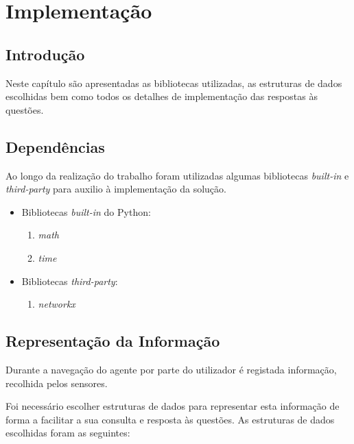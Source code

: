 \section{Implementação}
\label{chap:estado-da-arte}

\subsection{Introdução}
\label{chap2:sec:intro}

Neste capítulo são apresentadas as bibliotecas utilizadas, as estruturas de dados escolhidas bem como todos os detalhes de implementação das respostas às questões.

\subsection{Dependências}
\label{chap2:sec:dependencias}

Ao longo da realização do trabalho foram utilizadas algumas bibliotecas \textit{built-in} e \textit{third-party} para auxilio à implementação da solução.

\begin{itemize}
  \item Bibliotecas \textit{built-in} do Python:
  \begin{enumerate}
    \item \textit{math}
    \item \textit{time}
  \end{enumerate}

  \item Bibliotecas \textit{third-party}:
  \begin{enumerate}
      \item \textit{networkx}~\cite{networkx}
  \end{enumerate}
\end{itemize}

\clearpage
\subsection{Representação da Informação}
\label{chap2:sec:info}

Durante a navegação do agente por parte do utilizador é registada informação, recolhida pelos sensores.

Foi necessário escolher estruturas de dados para representar esta informação de forma a facilitar a sua consulta e resposta às questões. As estruturas de dados escolhidas foram as seguintes:

